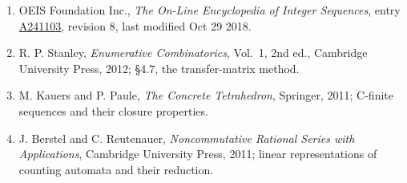 \documentclass[11pt]{article}
\theoremstyle{definition}
\begin{document}
\begin{enumerate}

\item OEIS Foundation Inc., \emph{The On-Line Encyclopedia of Integer Sequences}, entry \href{https://oeis.org/A241103}{A241103}, revision 8, last modified Oct 29 2018.

\item R. P. Stanley, \emph{Enumerative Combinatorics}, Vol.~1, 2nd ed., Cambridge University Press, 2012; \S4.7, the transfer-matrix method.

\item M. Kauers and P. Paule, \emph{The Concrete Tetrahedron}, Springer, 2011; C-finite sequences and their closure properties.

\item J. Berstel and C. Reutenauer, \emph{Noncommutative Rational Series with Applications}, Cambridge University Press, 2011; linear representations of counting automata and their reduction.

\end{enumerate}
\end{document}
